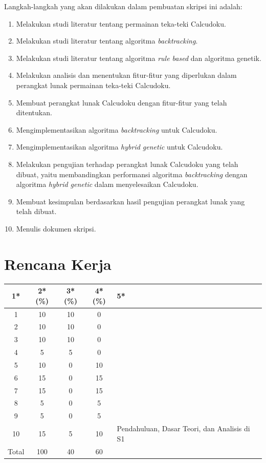 \documentclass[a4paper,twoside]{article}
\begin{document}
Langkah-langkah yang akan dilakukan dalam pembuatan skripsi ini adalah:
\begin{enumerate}
\item Melakukan studi literatur tentang permainan teka-teki Calcudoku.
\item Melakukan studi literatur tentang algoritma \textit{backtracking}.
\item Melakukan studi literatur tentang algoritma \textit{rule based} dan algoritma genetik.
\item Melakukan analisis dan menentukan fitur-fitur yang diperlukan dalam perangkat lunak permainan teka-teki Calcudoku.
\item Membuat perangkat lunak Calcudoku dengan fitur-fitur yang telah ditentukan. 
\item Mengimplementasikan algoritma \textit{backtracking} untuk Calcudoku.
\item Mengimplementasikan algoritma \textit{hybrid genetic} untuk Calcudoku.
\item Melakukan pengujian terhadap perangkat lunak Calcudoku yang telah dibuat, yaitu membandingkan performansi algoritma \textit{backtracking} dengan algoritma \textit{hybrid genetic} dalam menyelesaikan Calcudoku.
\item Membuat kesimpulan berdasarkan hasil pengujian perangkat lunak yang telah dibuat.
\item Menulis dokumen skripsi.
\end{enumerate}

\section{Rencana Kerja}

\begin{center}
  \begin{tabular}{ | c | c | c | c | l |}
    \hline
    1*  & 2*(\%) & 3*(\%) & 4*(\%) &5*\\ \hline \hline
    1 & 10 & 10 & 0 & \\ \hline
    2 & 10 & 10 & 0 & \\ \hline
    3 & 10 & 10 & 0 & \\ \hline
    4 & 5 & 5 & 0 & \\ \hline
    5 & 10 & 0 & 10 & \\ \hline
    6 & 15 & 0 & 15 & \\ \hline
    7 & 15 & 0 & 15 & \\ \hline
    8 & 5 & 0 & 5 & \\ \hline
    9 & 5 & 0 & 5 & \\ \hline
    10 & 15 & 5 & 10 & {\footnotesize Pendahuluan, Dasar Teori, dan Analisis di S1} \\ \hline
    Total & 100 & 40 & 60 & \\ \hline
	\end{tabular}
\end{center}
\end{document}
